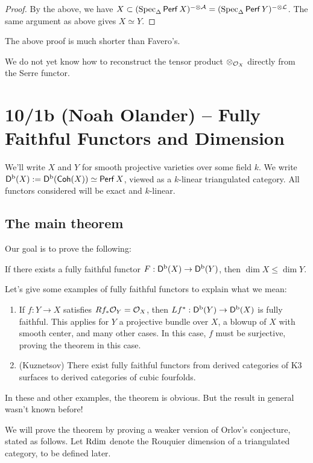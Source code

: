 \documentclass{amsart}
\begin{document}
\begin{proof}
	By the above, we have $X \subset (\operatorname{Spec}_\Delta \mathsf{Perf}\, X)^{- \otimes \mathcal{A}} = (\operatorname{Spec}_\Delta \mathsf{Perf}\, Y)^{- \otimes \mathcal{L}}$.
	The same argument as above gives $X \simeq Y$.
\end{proof}

The above proof is much shorter than Favero's.

\begin{rmk}
	We do not yet know how to reconstruct the tensor product $\otimes_{\mathcal{O}_X}$ directly from the Serre functor.
\end{rmk}

\section{10/1b (Noah Olander) -- Fully Faithful Functors and Dimension}

We'll write $X$ and $Y$ for smooth projective varieties over some field $k$.
We write $\mathsf{D}^{\mathrm{b}}(X) := \mathsf{D}^{\mathrm{b}}(\mathsf{Coh}(X)) \simeq \mathsf{Perf}\, X$, viewed as a $k$-linear triangulated category.
All functors considered will be exact and $k$-linear.

\subsection{The main theorem}

Our goal is to prove the following:

\begin{thm}[Theorem 1]
	If there exists a fully faithful functor $F: \mathsf{D}^{\mathrm{b}}(X) \to \mathsf{D}^{\mathrm{b}}(Y)$, then $\dim X \leq \dim Y$.
\end{thm}

Let's give some examples of fully faithful functors to explain what we mean:
\begin{enumerate}
	\item If $f: Y \to X$ satisfies $Rf_* \mathcal{O}_Y = \mathcal{O}_X$, then $Lf^*: \mathsf{D}^{\mathrm{b}}(Y) \to \mathsf{D}^{\mathrm{b}}(X)$ is fully faithful.
		This applies for $Y$ a projective bundle over $X$, a blowup of $X$ with smooth center, and many other cases.
		In this case, $f$ must be surjective, proving the theorem in this case.
	\item (Kuznetsov) There exist fully faithful functors from derived categories of K3 surfaces to derived categories of cubic fourfolds.
\end{enumerate}
In these and other examples, the theorem is obvious.
But the result in general wasn't known before!

We will prove the theorem by proving a weaker version of Orlov's conjecture, stated as follows.
Let $\operatorname{Rdim}$ denote the Rouquier dimension of a triangulated category, to be defined later.
\end{document}
